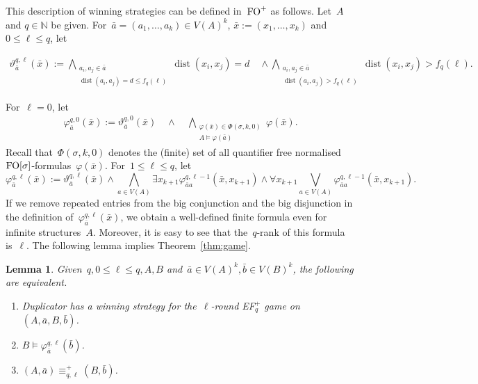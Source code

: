 \documentclass[11pt]{article}
\newtheorem{lemma}[theorem]{Lemma}
\numberwithin{equation}{section}
\newcommand{\N}{{\mathbb N}} \newcommand{\Q}{{\mathbb Q}}
\newcommand{\FO}{\textup{FO}}
\newcommand{\dist}{\operatorname{dist}}
\renewcommand{\phi}{\varphi}
\newcommand{\tup}[1]{\bar{#1}}
\begin{document}
This description of winning strategies can be defined in~$\FO^+$ as
follows. Let~$A$ and
$q\in \N$ be given. For~$\tup{a}=(a_1,\ldots, a_k)\in V(A)^k$, 
$\tup{x}:=(x_1,\ldots, x_k)$ and~$0\leq \ell\leq q$, let

  \begin{align*}
    \vartheta_{\tup{a}}^{q,{\ell}}(\tup x) := \bigwedge_{\substack{a_i, a_j\in \tup{a}\\\dist(a_i, a_j)=d\leq f_q({\ell})}}\dist(x_i, x_j)=d
    \quad\wedge \bigwedge_{\substack{a_i, a_j\in \tup{a}\\\dist(a_i, a_j)> f_q({\ell})}}\dist(x_i, x_j)>f_q({\ell}).
  \end{align*}

  For~${\ell}=0$, let
  \begin{align*}
    \phi_{\tup{a}}^{q,0} (\tup x):= \vartheta_{\tup{a}}^{q,0}(\tup
    x)\quad\wedge\quad \bigwedge_{\substack{\phi(\tup
        x)\in\Phi(\sigma,k,0)\\A\models\phi(\tup a)}}\phi(\tup{x}).
  \end{align*}
  Recall that~$\Phi(\sigma,k,0)$ denotes the (finite) set of all quantifier free
  normalised~$\FO[\sigma]$-formulas~$\phi(\tup x)$.
  For~$1\le{\ell}\leq q$, let
  \[
    \phi_{\tup{a}}^{q,{\ell}} (\tup x):= \vartheta_{\tup{a}}^{q,{\ell}}(\tup x)\wedge
    \bigwedge_{a\in
        V(A)}\exists
    x_{k+1}
    \phi_{\tup{a}a}^{q,{\ell}-1}(\tup{x},x_{k+1})\wedge 
    \forall x_{k+1}\bigvee_{a\in V(A)}\phi_{\tup{a}a}^{q,{\ell}-1}(\tup{x},x_{k+1}).
  \]
  If we remove repeated entries from the big conjunction and the big
  disjunction in the definition of~$\phi_{\tup{a}}^{q,{\ell}} (\tup
  x)$, we obtain a well-defined finite formula even for infinite
  structures~$A$. Moreover, it is easy to see that the~$q$-rank of
  this formula is~${\ell}$.  The following lemma implies
  Theorem~\ref{thm:game}.

\begin{lemma}\label{lem:game}
  Given~$q, 0\leq {\ell}\leq q, A, B$ and~$\tup{a}\in V(A)^{k}, \tup{b}\in
  V(B)^{k}$, the following are equivalent.
  \begin{enumerate}
  \item \label{item:ws}Duplicator has a winning strategy for
    the~${\ell}$-round EF$_q^+$ game on~$(A, \tup a,B,\tup b)$.
  \item \label{item:hint}$B\models\phi_{\tup{a}}^{q,{\ell}}(\tup{b})$.
  \item \label{item:equiv}$(A,\tup a)\equiv^+_{q, {\ell}} (B,\tup b)$.
  \end{enumerate}
\end{lemma}
\end{document}
